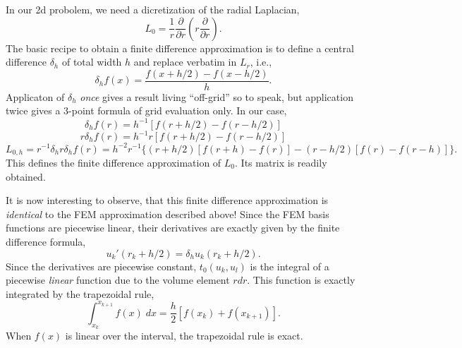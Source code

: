 \documentclass[12pt]{article}
\begin{document}
In our 2d probolem, we need a dicretization of the radial Laplacian,
\begin{equation}
    L_0 = \frac{1}{r} \frac{\partial}{\partial r} \left( r \frac{\partial}{\partial r} \right).
\end{equation}
The basic recipe to obtain a finite difference approximation is to define a central difference $\delta_h$ of total width $h$ and replace verbatim in $L_r$, i.e.,
\begin{equation}
    \delta_h f(x) = \frac{f(x+h/2) - f(x-h/2)}{h}.
\end{equation}
Applicaton of $\delta_h$ \emph{once} gives a result living ``off-grid'' so to speak, but application twice gives a 3-point formula of grid evaluation only. In our case,
\begin{equation}
    \delta_h f(r) = h^{-1}[f(r+h/2) - f(r-h/2)]
\end{equation}
\begin{equation}
    r \delta_h f(r) = h^{-1} r [f(r+h/2) - f(r-h/2)]
\end{equation}
\begin{equation}
    L_{0,h} = r^{-1} \delta_h r \delta_h f(r) = h^{-2} r^{-1} \{ (r+h/2) [f(r+h) - f(r)] - (r-h/2) [f(r) - f(r-h)] \}.
\end{equation}
This defines the finite difference approximation of $L_0$. Its matrix is readily obtained.

It is now interesting to observe, that this finite difference approximation is \emph{identical} to the FEM approximation described above! Since the FEM basis functions are piecewise linear, their derivatives are exactly given by the finite difference formula,
\begin{equation}
    u_k'(r_k + h/2) = \delta_h u_k(r_k + h/2).
\end{equation}
Since the derivatives are piecewise constant, $t_0(u_k,u_l)$ is the integral of a piecewise \emph{linear} function due to the volume element $r dr$. This function is exactly integrated by the trapezoidal rule,
\begin{equation}
    \int_{x_k}^{x_{k+1}} f(x) \; dx = \frac{h}{2} [f(x_k) + f(x_{k+1})].
\end{equation}
When $f(x)$ is linear over the interval, the trapezoidal rule is exact.
\end{document}
